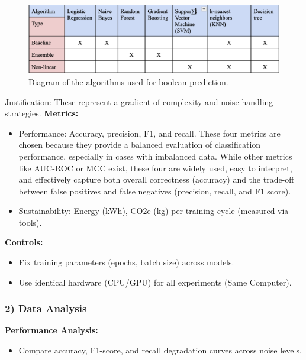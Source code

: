 \documentclass[conference]{IEEEtran}
\begin{document}
\begin{figure}[htbp]
    \centering
    \includegraphics[width=\linewidth, keepaspectratio]{img.png} %
    \caption{Diagram of the algorithms used for boolean prediction.}
    \label{fig:algorithms}
  \end{figure}
Justification: These represent a gradient of complexity and noise-handling strategies.
\newline
\newline
\textbf{Metrics:}
\begin{itemize}
    \item Performance: Accuracy, precision, F1, and recall. These four metrics are chosen because they provide a balanced evaluation of classification performance, especially in cases with imbalanced data. While other metrics like AUC-ROC or MCC exist, these four are widely used, easy to interpret, and effectively capture both overall correctness (accuracy) and the trade-off between false positives and false negatives (precision, recall, and F1 score).

    \item Sustainability: Energy (kWh), CO2e (kg) per training cycle (measured via tools).

\end{itemize}

\textbf{Controls:}
\begin{itemize}
    \item Fix training parameters (epochs, batch size) across models.

    \item Use identical hardware (CPU/GPU) for all experiments (Same Computer).
\end{itemize}




\subsubsection*{2) Data Analysis}
\textbf{Performance Analysis:}
\begin{itemize}
    \item Compare accuracy, F1-score, and recall degradation curves across noise levels.
\end{itemize}
\end{document}

